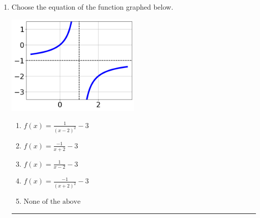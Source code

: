 \documentclass[14pt]{extbook}
\newcommand{\litem}[1]{\item#1\hspace*{-1cm}\rule{\textwidth}{0.4pt}}
\begin{document}
\begin{enumerate}
{\begin{enumerate}[label=\Alph*.]
\end{enumerate} }
\litem{
Choose the equation of the function graphed below.
\begin{center}
    \includegraphics[width=0.5\textwidth]{../Figures/rationalGraphToEquationC.png}
\end{center}
\begin{enumerate}[label=\Alph*.]
\item \( f(x) = \frac{1}{(x - 2)^2} - 3 \)
\item \( f(x) = \frac{-1}{x + 2} - 3 \)
\item \( f(x) = \frac{1}{x - 2} - 3 \)
\item \( f(x) = \frac{-1}{(x + 2)^2} - 3 \)
\item \( \text{None of the above} \)


\end{enumerate}}
\end{enumerate}
\end{document}
